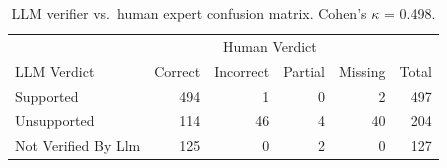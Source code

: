 \begin{table}[htbp]
\centering
\caption{LLM verifier vs.\ human expert confusion matrix. Cohen's $\kappa$ = 0.498.}
\label{tab:confusion}
\begin{tabular}{lrrrr|r}
\toprule
 & \multicolumn{4}{c|}{Human Verdict} & \\
LLM Verdict & Correct & Incorrect & Partial & Missing & Total \\
\midrule
  Supported & 494 & 1 & 0 & 2 & 497 \\
  Unsupported & 114 & 46 & 4 & 40 & 204 \\
  Not Verified By Llm & 125 & 0 & 2 & 0 & 127 \\
\bottomrule
\end{tabular}
\end{table}